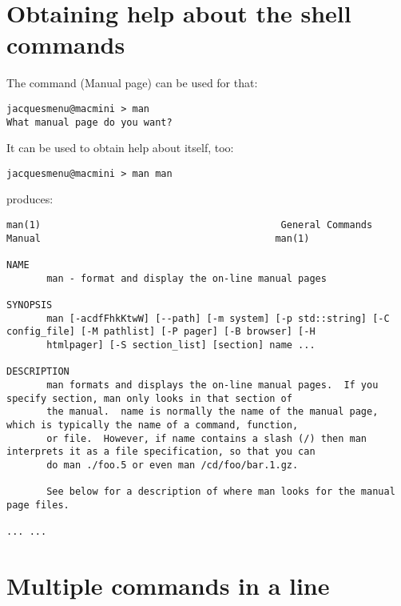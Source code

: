 \section{Obtaining help about the shell commands}

The  command (Manual page) can be used for that:
\begin{lstlisting}[language=Terminal]
jacquesmenu@macmini > man
What manual page do you want?
\end{lstlisting}

It can be used to obtain help about itself, too:
\begin{lstlisting}[language=Terminal]
jacquesmenu@macmini > man man
\end{lstlisting}

produces:
\begin{lstlisting}[language=Terminal]
man(1)                                          General Commands Manual                                         man(1)

NAME
       man - format and display the on-line manual pages

SYNOPSIS
       man [-acdfFhkKtwW] [--path] [-m system] [-p std::string] [-C config_file] [-M pathlist] [-P pager] [-B browser] [-H
       htmlpager] [-S section_list] [section] name ...

DESCRIPTION
       man formats and displays the on-line manual pages.  If you specify section, man only looks in that section of
       the manual.  name is normally the name of the manual page, which is typically the name of a command, function,
       or file.  However, if name contains a slash (/) then man interprets it as a file specification, so that you can
       do man ./foo.5 or even man /cd/foo/bar.1.gz.

       See below for a description of where man looks for the manual page files.

... ...
\end{lstlisting}


\section{Multiple commands in a line}

